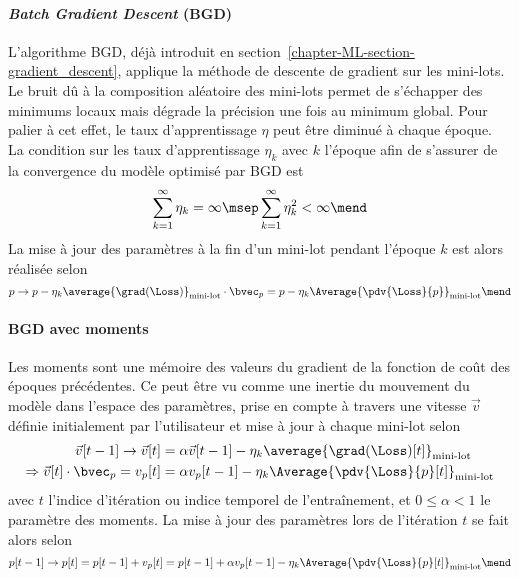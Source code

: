 \paragraph{\emph{Batch Gradient Descent} (BGD)} \cite{SGD}
L'algorithme BGD,
déjà introduit en section~\ref{chapter-ML-section-gradient_descent},
applique la méthode de descente de gradient
sur les mini-lots.
Le bruit dû à la composition aléatoire des mini-lots
permet de s'échapper des minimums locaux
mais dégrade la précision une fois au minimum global.
Pour palier à cet effet, le taux d'apprentissage $\eta$ peut être diminué à chaque époque.
La condition sur les taux d'apprentissage $\eta_k$ avec $k$ l'époque afin de s'assurer de la convergence du modèle optimisé par BGD est~\cite{DNN}
\begin{equation}
\sum_{k=1}^\infty \eta_k = \infty
\msep
\sum_{k=1}^\infty \eta_k^2 < \infty
\mend
\end{equation}
La mise à jour des paramètres à la fin d'un mini-lot pendant l'époque $k$ est alors réalisée selon
\begin{equation}
p \to p - \eta_k \average{\grad(\Loss)}_\text{mini-lot} \cdot \bvec_p = p - \eta_k \Average{\pdv{\Loss}{p}}_\text{mini-lot}
\mend
\end{equation}
\paragraph{BGD avec moments} \cite{DNN}
Les moments sont une \og mémoire \fg{} des valeurs du gradient de la fonction de coût des époques précédentes.
Ce peut être vu comme une inertie du mouvement du modèle dans l'espace des paramètres,
prise en compte à travers une vitesse $\vec{v}$ définie initialement par l'utilisateur et mise à jour à chaque mini-lot selon
\begin{align}
\vec{v}[t-1] \to \vec{v}[t]
&=
\alpha\vec{v}[t-1] - \eta_k \average{\grad(\Loss)[t]}_\text{mini-lot}
\\
\Rightarrow
\vec{v}[t]\cdot\bvec_p = v_p[t]
&=
\alpha v_p[t-1] - \eta_k \Average{\pdv{\Loss}{p} [t]}_\text{mini-lot}
\end{align}
avec
$t$ l'indice d'itération ou indice temporel de l'entraînement,
et
$0\leq\alpha<1$ le paramètre des moments.
La mise à jour des paramètres lors de l'itération $t$ se fait alors selon
\begin{equation}
p [t-1] \to p[t]
=
p[t-1] + v_p[t]
=
p[t-1] + \alpha v_p[t-1] - \eta_k \Average{\pdv{\Loss}{p} [t]}_\text{mini-lot}
\mend
\end{equation}
